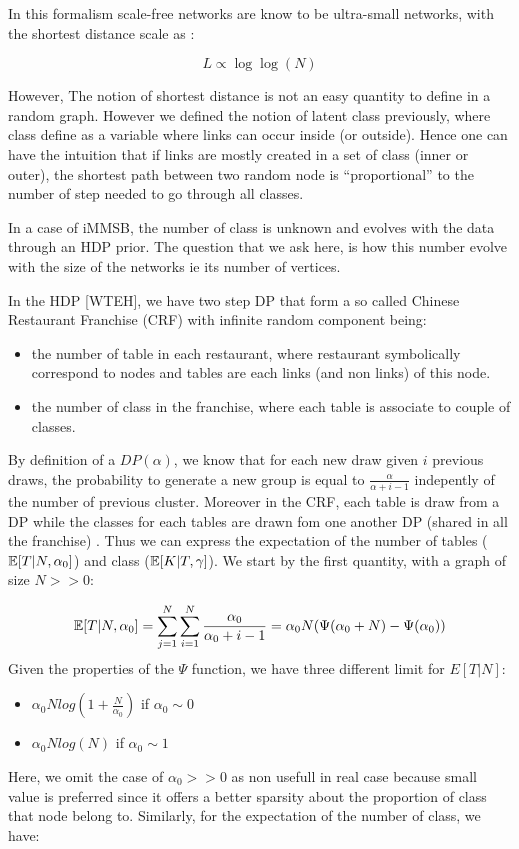 \documentclass[a4paper, 12pt]{article}
\begin{document}
In this formalism scale-free networks are know to be ultra-small
networks, with the shortest distance scale as \cite{cohen2003scale}:

\begin{equation}
L \propto \log\log(N)
\end{equation}

However, The notion of shortest distance is not an easy quantity to define in a
random graph. However we defined the notion of latent class previously,
where class define as a variable where links can occur inside (or
outside). Hence one can have the
intuition that if links are mostly created in a set of class (inner or
outer), the shortest path between two random node is
``proportional'' to the number of step needed  to go through all classes.

In a case of iMMSB, the number of class is unknown and evolves with the data
through an HDP prior. The question that we ask here, is how this number
evolve with the size of the networks ie its number of vertices.

In the HDP {[}WTEH{]}, we have two step DP that form a so called Chinese
Restaurant Franchise (CRF) with infinite random component being:
\begin{itemize}
\item the number of
table in each restaurant, where restaurant symbolically correspond to
nodes and tables are each links (and non links) of this node. 
\item the
number of class in the franchise, where each table is associate to
couple of classes.
\end{itemize}

By definition of a \(DP(\alpha)\), we know that for each new draw given
\(i\) previous draws, the probability to generate a new group is equal
to \(\frac{\alpha}{\alpha +i-1}\) indepently of the number of previous
cluster. Moreover in the CRF, each table is draw from a DP while the
classes for each tables are drawn fom one another DP (shared in all the
franchise) . Thus we can express the expectation of the number of tables
($\mathbb{E}[T|N, \alpha_0]$) and class ($\mathbb{E}[K|T, \gamma]$). We start by the first quantity, with a graph of size $N >> 0$:

\begin{align}
\mathbb{E}[T|N, \alpha_0] = \sum_{j=1}^N\sum_{i=1}^N \frac{\alpha_0}{\alpha_0 +i-1} = \alpha_0 N (\Psi(\alpha_0+N) - \Psi(\alpha_0))
\end{align}
Given the properties of the $\Psi$ function, we have three different limit for $E[T|N]$:
\begin{itemize}
	\item $\alpha_0 N log(1+\frac{N}{\alpha_0})$ if  $\alpha_0 \sim 0$
	\item $\alpha_0 N log(N)$ if  $\alpha_0 \sim 1$
\end{itemize}
Here, we omit the case of $\alpha_0 >> 0$ as non usefull in real case because small value is preferred since it offers a better sparsity about the proportion of class that node belong to.
Similarly, for the expectation of the number of class, we have:
\end{document}
